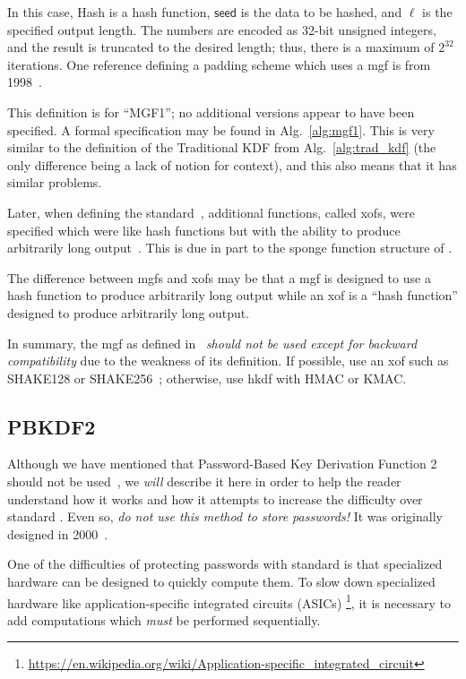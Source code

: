 \noindent
In this case, \textsf{Hash} is a hash function,
$\textsf{seed}$ is the data to be hashed,
and $\ell$ is the specified output length.
The numbers are encoded as 32-bit unsigned integers,
and the result is truncated to the desired length;
thus, there is a  maximum of $2^{32}$ iterations.
One reference defining a padding scheme which uses
a \gls{mgf} is from 1998~\cite{rfc2437}.

This definition is for ``MGF1'';
no additional versions appear to have been specified.
A formal specification may be found in Alg.~\ref{alg:mgf1}.
This is very similar to the definition
of the Traditional KDF from Alg.~\ref{alg:trad_kdf}
(the only difference being a lack of notion for context),
and this also means that it has similar problems.



Later, when defining the \ShaThree{} standard~\cite{FIPS-202},
additional functions, called \glspl{xof},
were specified which were like \glspl{hash function}
but with the ability to produce
arbitrarily long output~\cite[Section 6.2]{FIPS-202}.
This is due in part to the sponge function structure of \ShaThree{}.

The difference between \glspl{mgf} and \glspl{xof}
may be that a \gls{mgf} is designed to use a \gls{hash function}
to produce arbitrarily long output
while an \gls{xof} is a ``hash function'' designed
to produce arbitrarily long output.

In summary, the \gls{mgf} as defined in~\cite{rfc8017}
\emph{should not be used except for backward compatibility}
due to the weakness of its definition.
If possible, use an \gls{xof} such as
SHAKE128 or SHAKE256~\cite{FIPS-202,NIST-SP-800-185};
otherwise, use \gls{hkdf} with \textsf{HMAC} or \textsf{KMAC}.


\subsection{PBKDF2}
\label{app:crypto_pbkdf2}

Although we have mentioned that
Password-Based Key Derivation Function 2~\cite{rfc8018}
should not be used~\cite{blocki2018economics},
we \emph{will} describe it here in order to help the reader understand
how it works and how it attempts to increase the difficulty
over standard .
Even so, \emph{do not use this method to store passwords!}
It was originally designed in 2000~\cite{rfc2898}.

One of the difficulties of protecting passwords with standard
 is that specialized hardware
can be designed to quickly compute them.
To slow down specialized hardware like
application-specific integrated circuits (ASICs)%
\footnote{\url{https://en.wikipedia.org/wiki/Application-specific_integrated_circuit}},
it is necessary to add computations
which \emph{must} be performed sequentially.

